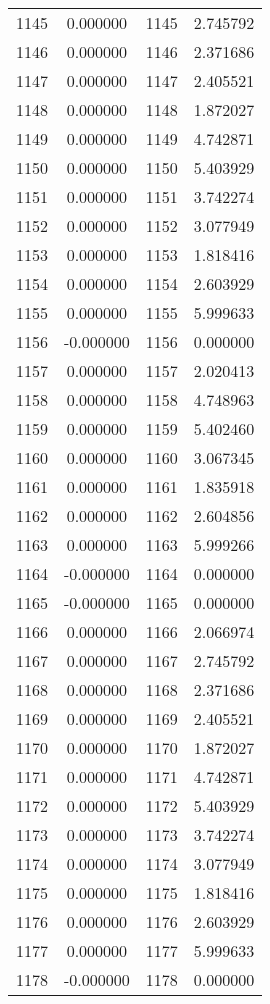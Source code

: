 \documentclass[12pt]{article}
\begin{document}
\begin{longtable}{@{}cccc@{}}
1145 & 0.000000 & 1145 & 2.745792 \\
1146 & 0.000000 & 1146 & 2.371686 \\
1147 & 0.000000 & 1147 & 2.405521 \\
1148 & 0.000000 & 1148 & 1.872027 \\
1149 & 0.000000 & 1149 & 4.742871 \\
1150 & 0.000000 & 1150 & 5.403929 \\
1151 & 0.000000 & 1151 & 3.742274 \\
1152 & 0.000000 & 1152 & 3.077949 \\
1153 & 0.000000 & 1153 & 1.818416 \\
1154 & 0.000000 & 1154 & 2.603929 \\
1155 & 0.000000 & 1155 & 5.999633 \\
1156 & -0.000000 & 1156 & 0.000000 \\
1157 & 0.000000 & 1157 & 2.020413 \\
1158 & 0.000000 & 1158 & 4.748963 \\
1159 & 0.000000 & 1159 & 5.402460 \\
1160 & 0.000000 & 1160 & 3.067345 \\
1161 & 0.000000 & 1161 & 1.835918 \\
1162 & 0.000000 & 1162 & 2.604856 \\
1163 & 0.000000 & 1163 & 5.999266 \\
1164 & -0.000000 & 1164 & 0.000000 \\
1165 & -0.000000 & 1165 & 0.000000 \\
1166 & 0.000000 & 1166 & 2.066974 \\
1167 & 0.000000 & 1167 & 2.745792 \\
1168 & 0.000000 & 1168 & 2.371686 \\
1169 & 0.000000 & 1169 & 2.405521 \\
1170 & 0.000000 & 1170 & 1.872027 \\
1171 & 0.000000 & 1171 & 4.742871 \\
1172 & 0.000000 & 1172 & 5.403929 \\
1173 & 0.000000 & 1173 & 3.742274 \\
1174 & 0.000000 & 1174 & 3.077949 \\
1175 & 0.000000 & 1175 & 1.818416 \\
1176 & 0.000000 & 1176 & 2.603929 \\
1177 & 0.000000 & 1177 & 5.999633 \\
1178 & -0.000000 & 1178 & 0.000000 \\

\end{longtable}
\end{document}
